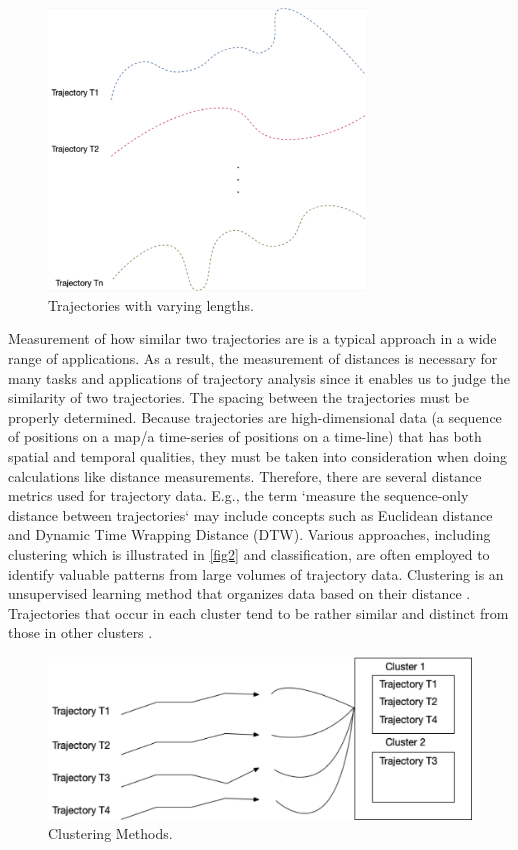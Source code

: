 \documentclass[a4paper, 12pt]{article}
\begin{document}
\begin{figure}[ht]
    \centering
    \includegraphics[width=0.75\textwidth]{Trajectories.png}
    \caption{Trajectories with varying lengths.}
    \label{fig1}
\end{figure}

Measurement of how similar two trajectories are is a typical approach in a wide range of applications. As a result, the measurement of distances is necessary for many tasks and applications of trajectory analysis since it enables us to judge the similarity of two trajectories. The spacing between the trajectories must be properly determined. Because trajectories are high-dimensional data (a sequence of positions on a map/a time-series of positions on a time-line) that has both spatial and temporal qualities, they must be taken into consideration when doing calculations like distance measurements. Therefore, there are several distance metrics used for trajectory data. E.g., the term `measure the sequence-only distance between trajectories` may include concepts such as Euclidean distance and Dynamic Time Wrapping Distance (DTW). Various approaches, including clustering which is illustrated in \autoref{fig2} and classification, are often employed to identify valuable patterns from large volumes of trajectory data. Clustering is an unsupervised learning method that organizes data based on their distance \citep{han2011data,xu2005survey}. Trajectories that occur in each cluster tend to be rather similar and distinct from those in other clusters \citep{berkhin2006survey,besse2015review, yuan2017review}.

\begin{figure}[ht]
    \centering
    \includegraphics[width=1\textwidth]{Cluster Methods.png}
    \caption{Clustering Methods.}
    \label{fig2}
\end{figure}
\end{document}
